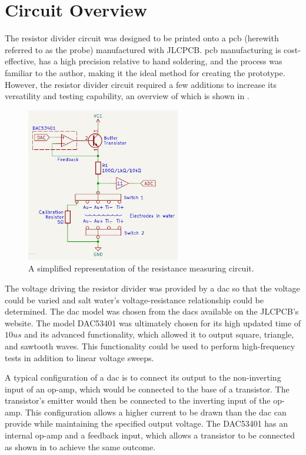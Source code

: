 \section{Circuit Overview}

The resistor divider circuit was designed to be printed onto a \gls{pcb} (herewith referred to as the probe) manufactured with JLCPCB.
\gls{pcb} manufacturing is cost-effective, has a high precision relative to hand soldering, and the process was familiar to the author, making it the ideal method for creating the prototype.
However, the resistor divider circuit required a few additions to increase its versatility and testing capability, an overview of which is shown in .

\begin{figure}[ht]
    \centering
    \includegraphics[width=0.6\textwidth]{Figures/CircuitOverview}
    \caption{A simplified representation of the resistance measuring circuit.}
    \label{fig:circuit-overview} %
\end{figure}

The voltage driving the resistor divider was provided by a \gls{dac} so that the voltage could be varied and salt water's voltage-resistance relationship could be determined.
The \gls{dac} model was chosen from the \glspl{dac} available on the JLCPCB's website.
The model DAC53401 was ultimately chosen for its high updated time of $10us$ and its advanced functionality, which allowed it to output square, triangle, and sawtooth waves.
This functionality could be used to perform high-frequency tests in addition to linear voltage sweeps.

A typical configuration of a \gls{dac} is to connect its output to the non-inverting input of an op-amp, which would be connected to the base of a transistor.
The transistor's emitter would then be connected to the inverting input of the op-amp.
This configuration allows a higher current to be drawn than the \gls{dac} can provide while maintaining the specified output voltage.
The DAC53401 has an internal op-amp and a feedback input, which allows a transistor to be connected as shown in  to achieve the same outcome.

